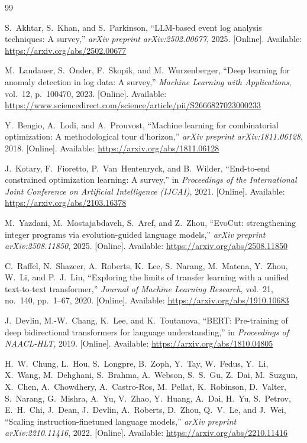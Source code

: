 \documentclass[11pt]{article}
\begin{document}
\begin{thebibliography}{99}

    S.~Akhtar, S.~Khan, and S.~Parkinson, ``LLM-based event log analysis techniques: A survey,''
    \emph{arXiv preprint arXiv:2502.00677}, 2025.
    [Online]. Available: \url{https://arxiv.org/abs/2502.00677}

    M.~Landauer, S.~Onder, F.~Skopik, and M.~Wurzenberger, ``Deep learning for anomaly detection in log data: A survey,''
    \emph{Machine Learning with Applications}, vol.~12, p.~100470, 2023.
    [Online]. Available: \url{https://www.sciencedirect.com/science/article/pii/S2666827023000233}

    Y.~Bengio, A.~Lodi, and A.~Prouvost, ``Machine learning for combinatorial optimization: A methodological tour d'horizon,''
    \emph{arXiv preprint arXiv:1811.06128}, 2018.
    [Online]. Available: \url{https://arxiv.org/abs/1811.06128}

    J.~Kotary, F.~Fioretto, P.~Van~Hentenryck, and B.~Wilder, ``End-to-end constrained optimization learning: A survey,''
    in \emph{Proceedings of the International Joint Conference on Artificial Intelligence (IJCAI)}, 2021.
    [Online]. Available: \url{https://arxiv.org/abs/2103.16378}

    M.~Yazdani, M.~Mostajabdaveh, S.~Aref, and Z.~Zhou, ``EvoCut: strengthening integer programs via evolution-guided language models,''
    \emph{arXiv preprint arXiv:2508.11850}, 2025.
    [Online]. Available: \url{https://arxiv.org/abs/2508.11850}

    C.~Raffel, N.~Shazeer, A.~Roberts, K.~Lee, S.~Narang, M.~Matena, Y.~Zhou, W.~Li, and P.~J.~Liu, ``Exploring the limits of transfer learning with a unified text-to-text transformer,''
    \emph{Journal of Machine Learning Research}, vol.~21, no.~140, pp.~1--67, 2020.
    [Online]. Available: \url{https://arxiv.org/abs/1910.10683}

    J.~Devlin, M.-W.~Chang, K.~Lee, and K.~Toutanova, ``BERT: Pre-training of deep bidirectional transformers for language understanding,''
    in \emph{Proceedings of NAACL-HLT}, 2019.
    [Online]. Available: \url{https://arxiv.org/abs/1810.04805}

    H.~W.~Chung, L.~Hou, S.~Longpre, B.~Zoph, Y.~Tay, W.~Fedus, Y.~Li, X.~Wang, M.~Dehghani, S.~Brahma, A.~Webson, S.~S.~Gu, Z.~Dai, M.~Suzgun, X.~Chen, A.~Chowdhery, A.~Castro-Ros, M.~Pellat, K.~Robinson, D.~Valter, S.~Narang, G.~Mishra, A.~Yu, V.~Zhao, Y.~Huang, A.~Dai, H.~Yu, S.~Petrov, E.~H.~Chi, J.~Dean, J.~Devlin, A.~Roberts, D.~Zhou, Q.~V.~Le, and J.~Wei, ``Scaling instruction-finetuned language models,''
    \emph{arXiv preprint arXiv:2210.11416}, 2022.
    [Online]. Available: \url{https://arxiv.org/abs/2210.11416}

\end{thebibliography}
\end{document}
